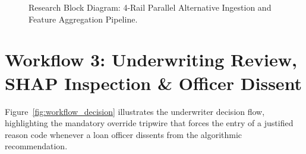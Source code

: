 \begin{figure}[H]
\caption{Research Block Diagram: 4-Rail Parallel Alternative Ingestion and Feature Aggregation Pipeline.}
\label{fig:workflow_ingestion}
\end{figure}

\section{Workflow 3: Underwriting Review, SHAP Inspection \& Officer Dissent}
Figure~\ref{fig:workflow_decision} illustrates the underwriter decision flow, highlighting the mandatory override tripwire that forces the entry of a justified reason code whenever a loan officer dissents from the algorithmic recommendation.

